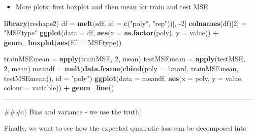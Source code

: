 \documentclass[]{article}
\newenvironment{Shaded}{\begin{snugshade}}{\end{snugshade}}
\newcommand{\DataTypeTok}[1]{\textcolor[rgb]{0.13,0.29,0.53}{#1}}
\newcommand{\DecValTok}[1]{\textcolor[rgb]{0.00,0.00,0.81}{#1}}
\newcommand{\KeywordTok}[1]{\textcolor[rgb]{0.13,0.29,0.53}{\textbf{#1}}}
\newcommand{\NormalTok}[1]{#1}
\newcommand{\OperatorTok}[1]{\textcolor[rgb]{0.81,0.36,0.00}{\textbf{#1}}}
\newcommand{\StringTok}[1]{\textcolor[rgb]{0.31,0.60,0.02}{#1}}
\providecommand{\tightlist}{%
  \setlength{\itemsep}{0pt}\setlength{\parskip}{0pt}}
\begin{document}
\begin{itemize}
\tightlist
\item
  More plots: first boxplot and then mean for train and test MSE
\end{itemize}

\begin{Shaded}
\begin{Highlighting}[]
\KeywordTok{library}\NormalTok{(reshape2)}
\NormalTok{df =}\StringTok{ }\KeywordTok{melt}\NormalTok{(sdf, }\DataTypeTok{id =} \KeywordTok{c}\NormalTok{(}\StringTok{"poly"}\NormalTok{, }\StringTok{"rep"}\NormalTok{))[, }\DecValTok{-2}\NormalTok{]}
\KeywordTok{colnames}\NormalTok{(df)[}\DecValTok{2}\NormalTok{] =}\StringTok{ "MSEtype"}
\KeywordTok{ggplot}\NormalTok{(}\DataTypeTok{data =}\NormalTok{ df, }\KeywordTok{aes}\NormalTok{(}\DataTypeTok{x =} \KeywordTok{as.factor}\NormalTok{(poly), }\DataTypeTok{y =}\NormalTok{ value)) }\OperatorTok{+}\StringTok{ }\KeywordTok{geom_boxplot}\NormalTok{(}\KeywordTok{aes}\NormalTok{(}\DataTypeTok{fill =}\NormalTok{ MSEtype))}
\end{Highlighting}
\end{Shaded}

\begin{Shaded}
\begin{Highlighting}[]
\NormalTok{trainMSEmean =}\StringTok{ }\KeywordTok{apply}\NormalTok{(trainMSE, }\DecValTok{2}\NormalTok{, mean)}
\NormalTok{testMSEmean =}\StringTok{ }\KeywordTok{apply}\NormalTok{(testMSE, }\DecValTok{2}\NormalTok{, mean)}
\NormalTok{meandf =}\StringTok{ }\KeywordTok{melt}\NormalTok{(}\KeywordTok{data.frame}\NormalTok{(}\KeywordTok{cbind}\NormalTok{(}\DataTypeTok{poly =} \DecValTok{1}\OperatorTok{:}\NormalTok{nord, trainMSEmean, testMSEmean)), }
    \DataTypeTok{id =} \StringTok{"poly"}\NormalTok{)}
\KeywordTok{ggplot}\NormalTok{(}\DataTypeTok{data =}\NormalTok{ meandf, }\KeywordTok{aes}\NormalTok{(}\DataTypeTok{x =}\NormalTok{ poly, }\DataTypeTok{y =}\NormalTok{ value, }\DataTypeTok{colour =}\NormalTok{ variable)) }\OperatorTok{+}\StringTok{ }
\StringTok{    }\KeywordTok{geom_line}\NormalTok{()}
\end{Highlighting}
\end{Shaded}

\begin{center}\rule{0.5\linewidth}{\linethickness}\end{center}

\#\#\#c) Bias and variance - we use the truth!

Finally, we want to see how the expected quadratic loss can be
decomposed into
\end{document}
